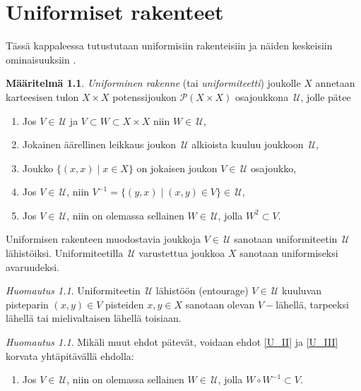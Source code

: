 \documentclass[12pt,a4paper,leqno]{report}
\newcommand{\U}{\,\mathcal{U}}
\newcommand{\Pot}{\mathcal{P}}
\theoremstyle{plain}
\theoremstyle{definition}
\newtheorem{maar}[equation]{Määritelmä}
\theoremstyle{remark}
\newtheorem{huom}[equation]{Huomautus}
\begin{document}
\chapter{Uniformiset rakenteet}
Tässä kappaleessa tutustutaan uniformisiin rakenteisiin ja näiden keskeisiin ominaisuuksiin \cite{Eom1}.
\begin{maar}\label{uniformi_maar}
\emph{Uniforminen rakenne} (tai \emph{uniformiteetti}) joukolle $X$ annetaan karteesisen tulon $X\times X$ potenssijoukon $\Pot(X\times X)$ osajoukkona $\U$, jolle pätee %
\begin{enumerate} [label=(U\arabic*),ref=(U\arabic*)]
\item\label{F_I} Jos $V\in \U$ ja $V\subset W\subset X\times X$ niin $ W\in\U$,
\item\label{F_II} Jokainen äärellinen leikkaus joukon $\U$ alkioista kuuluu joukkoon $\U$,
\item\label{U_I} Joukko $\{(x,x)\mid x\in X\}$ on jokaisen joukon $V\in\U$ osajoukko,
\item\label{U_II} Jos $V\in\U$, niin $V^{-1}=\{(y,x)\mid (x,y)\in V\}\in\U$,
\item\label{U_III} Jos $V\in \U$, niin on olemassa sellainen $W\in \U$, jolla $ W^2\subset V$.%
\end{enumerate}
Uniformisen rakenteen muodostavia joukkoja $ V\in\U$ sanotaan uniformiteetin $\U$ lähistöiksi. 
Uniformiteetilla $\U$ varustettua joukkoa $X$ sanotaan uniformiseksi avaruudeksi.
\end{maar}
\begin{huom}\label{V-close}
Uniformiteetin $\U$ lähistöön (entourage) $V\in\U $ kuuluvan 
pisteparin $(x,y)\in V$ pisteiden $x,y\in X$ sanotaan olevan $V-$lähellä, 
tarpeeksi lähellä tai mielivaltaisen lähellä toisiaan.
\end{huom}
\begin{huom}\label{UaHuom}
Mikäli muut ehdot pätevät, voidaan ehdot \ref{U_II} ja \ref{U_III} korvata yhtäpitävällä ehdolla: 
\begin{enumerate} [label=(Ua),ref=(Ua)]
\item \label{Uaehto} 
Jos $V\in \U$, niin on olemassa sellainen $W\in \U$, jolla $ W\circ W^{-1}\subset V$.
\end{enumerate}
%
\end{huom}
\end{document}
